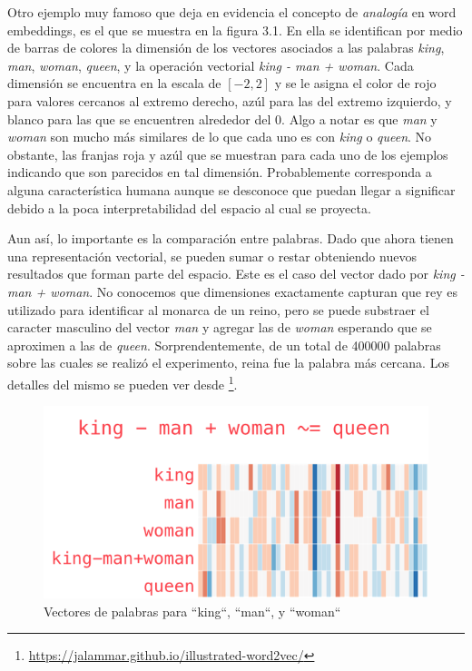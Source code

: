 Otro ejemplo muy famoso que deja en evidencia el concepto de \emph{analogía} en
word embeddings, es el que se muestra en la figura 3.1. En ella se identifican
por medio de barras de colores la dimensión de los vectores asociados a las
palabras \emph{king}, \emph{man}, \emph{woman}, \emph{queen}, y la operación
vectorial \emph{king - man + woman}. Cada dimensión se encuentra en la escala de
$[-2, 2]$ y se le asigna el color de rojo para valores cercanos al extremo
derecho, azúl para las del extremo izquierdo, y blanco para las que se
encuentren alrededor del 0.  Algo a notar es que \emph{man} y \emph{woman} son
mucho más similares de lo que cada uno es con \emph{king} o \emph{queen}. No
obstante, las franjas roja y azúl que se muestran para cada uno de los ejemplos
indicando que son parecidos en tal dimensión. Probablemente corresponda a alguna
característica humana aunque se desconoce que puedan llegar a significar
debido a la poca interpretabilidad del espacio al cual se proyecta. 

Aun así, lo importante es la comparación entre palabras. Dado que ahora tienen
una representación vectorial, se pueden sumar o restar obteniendo nuevos
resultados que forman parte del espacio. Este es el caso del vector dado por
\emph{king - man + woman}. No conocemos que dimensiones exactamente capturan que
rey es utilizado para identificar al monarca de un reino, pero se puede
substraer el caracter masculino del vector \emph{man} y agregar las de
\emph{woman} esperando que se aproximen a las de \emph{queen}.
Sorprendentemente, de un total de 400000 palabras sobre las cuales se realizó el
experimento, reina fue la palabra más cercana. Los detalles del mismo se pueden
ver desde \footnote{\url{https://jalammar.github.io/illustrated-word2vec/}}.

\begin{figure}
    \centering
    \includegraphics[scale=0.68]{figures/king-analogy-viz.png}
    \caption{Vectores de palabras para ``king``, ``man``, y ``woman``}
\end{figure}


